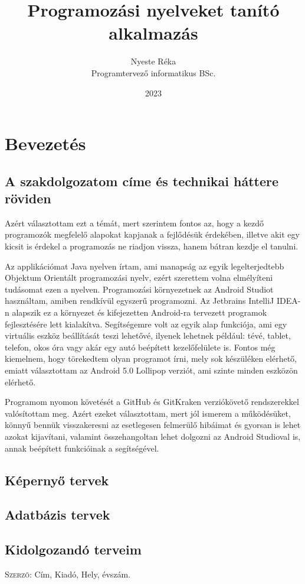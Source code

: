 \documentclass{thesis-ekf}
\begin{document}
	\title{Programozási nyelveket tanító alkalmazás}
	\author{Nyeste Réka\\Programtervező informatikus BSc.}
	\date{2023}
	\maketitle
	\tableofcontents
	\chapter{Bevezetés}
	\section{A szakdolgozatom címe és technikai háttere röviden}
	Azért választottam ezt a témát, mert szerintem fontos az, hogy a kezdő programozók megfelelő alapokat kapjanak a fejlődésük érdekében, illetve akit egy kicsit is érdekel a programozás ne riadjon vissza, hanem bátran kezdje el tanulni.
	
	Az applikációmat Java nyelven írtam, ami manapság az egyik legelterjedtebb Objektum Orientált programozási nyelv, ezért szerettem volna elmélyíteni tudásomat ezen a nyelven. Programozási környezetnek az Android Studiot használtam, amiben rendkívül egyszerű programozni. Az Jetbrains IntelliJ IDEA-n alapszik ez a környezet és kifejezetten Android-ra tervezett programok fejlesztésére lett kialakítva. Segítségemre volt az egyik alap funkciója, ami egy virtuális eszköz beállítását teszi lehetővé, ilyenek lehetnek például: tévé, tablet, telefon, okos óra vagy akár egy autó beépített kezelőfelülete is. Fontos még kiemelnem, hogy törekedtem olyan programot írni, mely sok készüléken elérhető, emiatt választottam az Android 5.0 Lollipop verziót, ami szinte minden eszközön elérhető.
	
	Programom nyomon követését a GitHub és GitKraken verziókövető rendszerekkel valósítottam meg. Azért ezeket választottam, mert jól ismerem a működésüket, könnyű bennük visszakeresni az esetlegesen felmerülő hibáimat és gyorsan is lehet azokat kijavítani, valamint összehangoltan lehet dolgozni az Android Studioval is, annak beépített funkcióinak a segítségével. 
	
	\section{Képernyő tervek}
	\section{Adatbázis tervek}
	\section{Kidolgozandó terveim}
	\begin{thebibliography}{1}
		 \textsc{Szerző}: Cím, Kiadó, Hely, évszám.
	\end{thebibliography}
\end{document}
